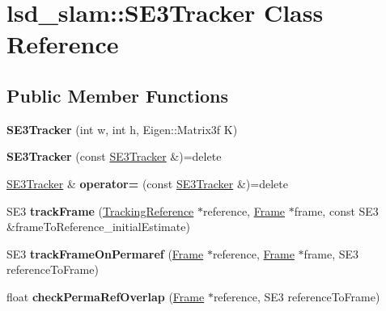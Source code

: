 \hypertarget{classlsd__slam_1_1_s_e3_tracker}{\section{lsd\-\_\-slam\-:\-:S\-E3\-Tracker Class Reference}
\label{classlsd__slam_1_1_s_e3_tracker}
}
\subsection*{Public Member Functions}
\begin{DoxyCompactItemize}
\item 
\hypertarget{classlsd__slam_1_1_s_e3_tracker_a7dfbca57408f4dfe6491b096ba2f072c}{{\bfseries S\-E3\-Tracker} (int w, int h, Eigen\-::\-Matrix3f K)}\label{classlsd__slam_1_1_s_e3_tracker_a7dfbca57408f4dfe6491b096ba2f072c}

\item 
\hypertarget{classlsd__slam_1_1_s_e3_tracker_a055b8a30a6ee118e2b9db62bf49b2970}{{\bfseries S\-E3\-Tracker} (const \hyperlink{classlsd__slam_1_1_s_e3_tracker}{S\-E3\-Tracker} \&)=delete}\label{classlsd__slam_1_1_s_e3_tracker_a055b8a30a6ee118e2b9db62bf49b2970}

\item 
\hypertarget{classlsd__slam_1_1_s_e3_tracker_a032debfb5622d767383c4821442bae5e}{\hyperlink{classlsd__slam_1_1_s_e3_tracker}{S\-E3\-Tracker} \& {\bfseries operator=} (const \hyperlink{classlsd__slam_1_1_s_e3_tracker}{S\-E3\-Tracker} \&)=delete}\label{classlsd__slam_1_1_s_e3_tracker_a032debfb5622d767383c4821442bae5e}

\item 
\hypertarget{classlsd__slam_1_1_s_e3_tracker_ad9192d9c768a9920f2c0374ea66f1ee2}{S\-E3 {\bfseries track\-Frame} (\hyperlink{classlsd__slam_1_1_tracking_reference}{Tracking\-Reference} $\ast$reference, \hyperlink{classlsd__slam_1_1_frame}{Frame} $\ast$frame, const S\-E3 \&frame\-To\-Reference\-\_\-initial\-Estimate)}\label{classlsd__slam_1_1_s_e3_tracker_ad9192d9c768a9920f2c0374ea66f1ee2}

\item 
\hypertarget{classlsd__slam_1_1_s_e3_tracker_a01873383b027fb673d8bada325412d8e}{S\-E3 {\bfseries track\-Frame\-On\-Permaref} (\hyperlink{classlsd__slam_1_1_frame}{Frame} $\ast$reference, \hyperlink{classlsd__slam_1_1_frame}{Frame} $\ast$frame, S\-E3 reference\-To\-Frame)}\label{classlsd__slam_1_1_s_e3_tracker_a01873383b027fb673d8bada325412d8e}

\item 
\hypertarget{classlsd__slam_1_1_s_e3_tracker_a96ab1ad07442965473c742347e5df564}{float {\bfseries check\-Perma\-Ref\-Overlap} (\hyperlink{classlsd__slam_1_1_frame}{Frame} $\ast$reference, S\-E3 reference\-To\-Frame)}\label{classlsd__slam_1_1_s_e3_tracker_a96ab1ad07442965473c742347e5df564}

\end{DoxyCompactItemize}
